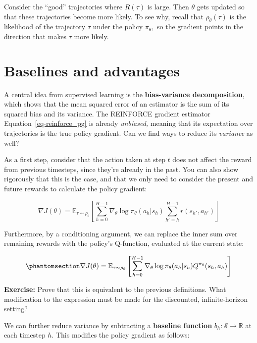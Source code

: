 \documentclass[
  letterpaper,
  DIV=11,
  numbers=noendperiod]{scrreprt}
\theoremstyle{plain}
\theoremstyle{plain}
\theoremstyle{definition}
\theoremstyle{definition}
\theoremstyle{remark}
\begin{document}
Consider the ``good'' trajectories where \(R(\tau)\) is large. Then
\(\theta\) gets updated so that these trajectories become more likely.
To see why, recall that \(\rho_{\theta}(\tau)\) is the likelihood of the
trajectory \(\tau\) under the policy \(\pi_\theta,\) so the gradient
points in the direction that makes \(\tau\) more likely.

\section{Baselines and advantages}\label{baselines-and-advantages}

A central idea from supervised learning is the \textbf{bias-variance
decomposition}, which shows that the mean squared error of an estimator
is the sum of its squared bias and its variance. The REINFORCE gradient
estimator Equation~\ref{eq-reinforce_pg} is already \emph{unbiased,}
meaning that its expectation over trajectories is the true policy
gradient. Can we find ways to reduce its \emph{variance} as well?

As a first step, consider that the action taken at step \(t\) does not
affect the reward from previous timesteps, since they're already in the
past. You can also show rigorously that this is the case, and that we
only need to consider the present and future rewards to calculate the
policy gradient:

\[
\nabla J(\theta) = \mathbb{E}_{\tau \sim \rho_\theta} \left[ \sum_{h=0}^{H-1} \nabla_\theta \log \pi_{\theta}(a_h| s_h) \sum_{h' = h}^{H-1} r(s_{h'}, a_{h'}) \right]
\]

Furthermore, by a conditioning argument, we can replace the inner sum
over remaining rewards with the policy's Q-function, evaluated at the
current state:

\begin{equation}\phantomsection\label{eq-pg_with_q}{
\nabla J(\theta) = \mathbb{E}_{\tau \sim \rho_\theta} \left[ \sum_{h=0}^{H-1} \nabla_\theta \log \pi_{\theta}(a_h| s_h) Q^{\pi_\theta}(s_{h}, a_{h}) \right]
}\end{equation}

\textbf{Exercise:} Prove that this is equivalent to the previous
definitions. What modification to the expression must be made for the
discounted, infinite-horizon setting?

We can further reduce variance by subtracting a \textbf{baseline
function} \(b_h: \mathcal{S} \to \mathbb{R}\) at each timestep \(h\).
This modifies the policy gradient as follows:
\end{document}
